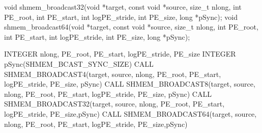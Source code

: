 \synC   %

void shmem_broadcast32(void *target, const void *source, size_t nlong, int PE_root, int PE_start, int logPE_stride, int PE_size, long *pSync);
void shmem_broadcast64(void *target, const void *source, size_t nlong, int PE_root, int PE_start, int logPE_stride, int PE_size, long *pSync); %
\synF   %

INTEGER nlong, PE_root, PE_start, logPE_stride, PE_size
INTEGER pSync(SHMEM_BCAST_SYNC_SIZE)
CALL SHMEM_BROADCAST4(target, source, nlong, PE_root, PE_start, logPE_stride, PE_size, pSync)
CALL SHMEM_BROADCAST8(target, source, nlong, PE_root, PE_start, logPE_stride, PE_size, pSync)
CALL SHMEM_BROADCAST32(target, source, nlong, PE_root, PE_start, logPE_stride, PE_size,pSync)
CALL SHMEM_BROADCAST64(target, source, nlong, PE_root, PE_start, logPE_stride, PE_size,pSync)%
 
